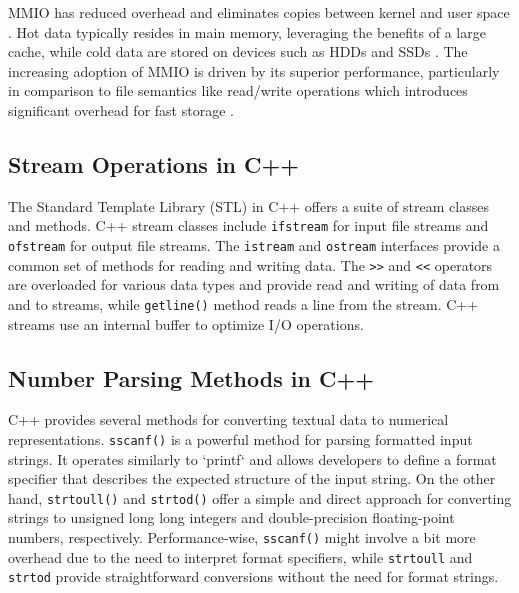 MMIO has reduced overhead and eliminates copies between kernel and user space \cite{malliotakis2021hugemap, papagiannis2020optimizing}. Hot data typically resides in main memory, leveraging the benefits of a large cache, while cold data are stored on devices such as HDDs and SSDs \cite{song2016efficient}. The increasing adoption of MMIO is driven by its superior performance, particularly in comparison to file semantics like read/write operations which introduces significant overhead for fast storage \cite{yoshimura2019evfs, enberg2022transcending}. 




\subsection{Stream Operations in C++}

The Standard Template Library (STL) in C++ offers a suite of stream classes and methods. C++ stream classes include \texttt{ifstream} for input file streams and \texttt{ofstream} for output file streams. The \texttt{istream} and \texttt{ostream} interfaces provide a common set of methods for reading and writing data. The \texttt{>>} and \texttt{<<} operators are overloaded for various data types and provide read and writing of data from and to streams, while \texttt{getline()} method reads a line from the stream. C++ streams use an internal buffer to optimize I/O operations.




\subsection{Number Parsing Methods in C++}

C++ provides several methods for converting textual data to numerical representations. \texttt{sscanf()} is a powerful method for parsing formatted input strings. It operates similarly to `printf` and allows developers to define a format specifier that describes the expected structure of the input string. On the other hand, \texttt{strtoull()} and \texttt{strtod()} offer a simple and direct approach for converting strings to unsigned long long integers and double-precision floating-point numbers, respectively. Performance-wise, \texttt{sscanf()} might involve a bit more overhead due to the need to interpret format specifiers, while \texttt{strtoull} and \texttt{strtod} provide straightforward conversions without the need for format strings.
